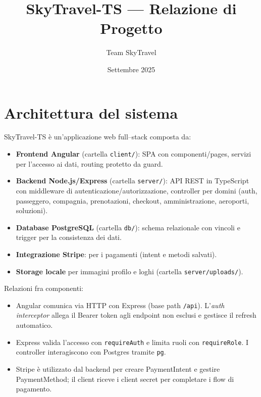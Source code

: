 \documentclass[11pt,a4paper]{article}
\title{SkyTravel-TS — Relazione di Progetto}
\author{Team SkyTravel}
\date{Settembre 2025}
\begin{document}
\maketitle
\tableofcontents
\newpage

\section{Architettura del sistema}
SkyTravel-TS è un'applicazione web full–stack composta da:
\begin{itemize}
  \item \textbf{Frontend Angular} (cartella \texttt{client/}): SPA con componenti/pages, servizi per l'accesso ai dati, routing protetto da guard.
  \item \textbf{Backend Node.js/Express} (cartella \texttt{server/}): API REST in TypeScript con middleware di autenticazione/autorizzazione, controller per domini (auth, passeggero, compagnia, prenotazioni, checkout, amministrazione, aeroporti, soluzioni).
  \item \textbf{Database PostgreSQL} (cartella \texttt{db/}): schema relazionale con vincoli e trigger per la consistenza dei dati.
  \item \textbf{Integrazione Stripe}: per i pagamenti (intent e metodi salvati).
  \item \textbf{Storage locale} per immagini profilo e loghi (cartella \texttt{server/uploads/}).
\end{itemize}

Relazioni fra componenti:
\begin{itemize}
  \item Angular comunica via HTTP con Express (base path \texttt{/api}). L'\emph{auth interceptor} allega il Bearer token agli endpoint non esclusi e gestisce il refresh automatico.
  \item Express valida l'accesso con \texttt{requireAuth} e limita ruoli con \texttt{requireRole}. I controller interagiscono con Postgres tramite \texttt{pg}.
  \item Stripe è utilizzato dal backend per creare PaymentIntent e gestire PaymentMethod; il client riceve i client secret per completare i flow di pagamento.
\end{itemize}
 
\end{document}
